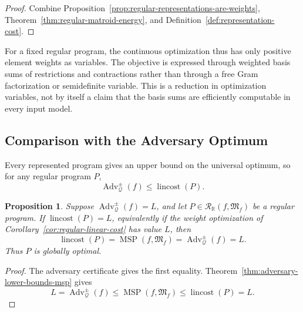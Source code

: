 \documentclass[11pt]{article}
\numberwithin{equation}{section}
\newtheorem{proposition}[definition]{Proposition}
\theoremstyle{remark}
\begin{document}
\begin{proof}
Combine Proposition~\ref{prop:regular-representations-are-weights},
Theorem~\ref{thm:regular-matroid-energy}, and
Definition~\ref{def:representation-cost}.
\end{proof}

For a fixed regular program, the continuous optimization thus has only
positive element weights as variables. The objective is expressed through
weighted basis sums of restrictions and contractions rather than through a
free Gram factorization or semidefinite variable. This is a reduction in
optimization variables, not by itself a claim that the basis sums are
efficiently computable in every input model.


\subsection{Comparison with the Adversary Optimum}
\label{subsec:regular-optimality-certification}

Every represented program gives an upper bound on the universal optimum, so
for any regular program $P$,
\begin{equation}
    \operatorname{Adv}^{\pm}_{\mathcal Q}(f)
    \leq
    \operatorname{lincost}(P).
\end{equation}

\begin{proposition}
\label{prop:regular-optimality-certificate}
Suppose
$\operatorname{Adv}^{\pm}_{\mathcal Q}(f)=L$, and let
$P\in\mathscr R_{\mathbb R}(f,\mathfrak M_f)$ be a regular program. If
$\operatorname{lincost}(P)=L$, equivalently if the weight optimization of
Corollary~\ref{cor:regular-linear-cost} has value $L$, then
\begin{equation}
    \operatorname{lincost}(P)
    =
    \operatorname{MSP}(f,\mathfrak M_f)
    =
    \operatorname{Adv}^{\pm}_{\mathcal Q}(f)
    =
    L.
\end{equation}
Thus $P$ is globally optimal.
\end{proposition}

\begin{proof}
The adversary certificate gives the first equality. Theorem~\ref{thm:adversary-lower-bounds-msp}
gives
\begin{equation}
    L
    =
    \operatorname{Adv}^{\pm}_{\mathcal Q}(f)
    \leq
    \operatorname{MSP}(f,\mathfrak M_f)
    \leq
    \operatorname{lincost}(P)
    =
    L.
\end{equation}
\end{proof}
\end{document}
